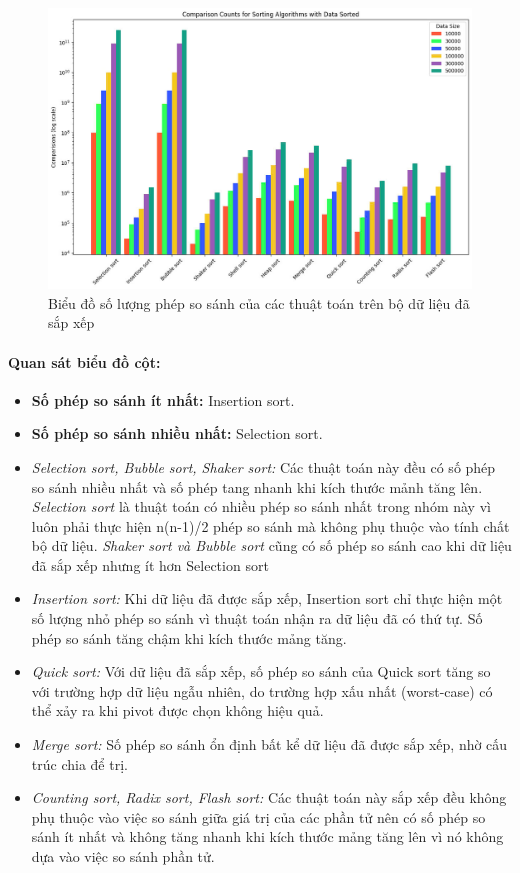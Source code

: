     \newpage
    \begin{figure}[H]
        \centering
        \includegraphics[width = 1\linewidth]{img/experiment/comparison/COMPARISON_SORTED.jpg}
        \caption{Biểu đồ số lượng phép so sánh của các thuật toán trên bộ dữ liệu đã sắp xếp}
    \end{figure}
    \paragraph{Quan sát biểu đồ cột:}
    \begin{itemize}
        \item \textbf{Số phép so sánh ít nhất:} Insertion sort.
        \item \textbf{Số phép so sánh nhiều nhất:} Selection sort.
        \item \textit{Selection sort, Bubble sort, Shaker sort:} Các thuật toán này đều có số phép so sánh nhiều nhất và số phép tang nhanh khi kích thước mảnh tăng lên. \textit{Selection sort} là thuật toán có nhiều phép so sánh nhất trong nhóm này vì luôn phải thực hiện n(n-1)/2 phép so sánh mà không phụ thuộc vào tính chất bộ dữ liệu. \textit{Shaker sort và Bubble sort} cũng có số phép so sánh cao khi dữ liệu đã sắp xếp nhưng ít hơn Selection sort
        \item \textit{Insertion sort: }Khi dữ liệu đã được sắp xếp, Insertion sort chỉ thực hiện một số lượng nhỏ phép so sánh vì thuật toán nhận ra dữ liệu đã có thứ tự. Số phép so sánh tăng chậm khi kích thước mảng tăng.
        \item \textit{Quick sort:} Với dữ liệu đã sắp xếp, số phép so sánh của Quick sort tăng so với trường hợp dữ liệu ngẫu nhiên, do trường hợp xấu nhất (worst-case) có thể xảy ra khi pivot được chọn không hiệu quả.
        \item \textit{Merge sort: }Số phép so sánh ổn định bất kể dữ liệu đã được sắp xếp, nhờ cấu trúc chia để trị.
        \item \textit{Counting sort, Radix sort, Flash sort:} Các thuật toán này sắp xếp đều không phụ thuộc vào việc so sánh giữa giá trị của các phần tử nên có số phép so sánh ít nhất và không tăng nhanh khi kích thước mảng tăng lên vì nó không dựa vào việc so sánh phần tử.
    \end{itemize}


